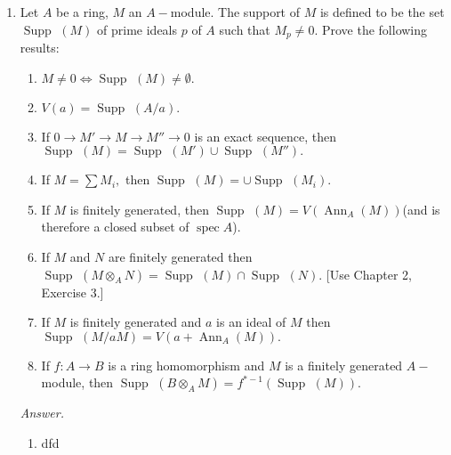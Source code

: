 \documentclass[answers, 12pt]{exam}
\DeclareMathOperator{\spec}{\text{spec}}
\DeclareMathOperator{\ann}{\text{Ann}}
\DeclareMathOperator{\supp}{\text{Supp~}}
\begin{document}
\begin{enumerate}

\item Let $A$ be a ring, $M$ an $A-$module. The support of $M$ is defined to be the set  $\supp(M)$ of prime ideals $p$ of $A$ such that $M_p\neq 0.$ Prove the following results:

		\begin{enumerate}
	
			\item $M\neq 0\Leftrightarrow \supp(M)\neq \emptyset.$
		
			\item $V(a)=\supp (A/a).$
		
			\item If $0\to M'\to M\to M''\to 0$ is an exact sequence, then $\supp(M)=\supp(M')\cup \supp(M'').$
		
			\item If $M=\sum M_i,$ then $\supp(M)=\cup\supp(M_i).$
		
			\item If $M$ is finitely generated, then $\supp(M)=V(\ann_A(M))$(and is therefore a closed subset of $\spec A$).
		
			\item If $M$ and $N$ are finitely generated then $\supp (M\otimes_A N)=\supp(M)\cap \supp(N).$ [Use Chapter 2, Exercise 3.]
		
			\item If $M$ is finitely generated and $a$ is an ideal of $M$ then $\supp(M/aM)=V(a+\ann_A(M)).$
		
			\item If $f:A\to B$ is a ring homomorphism and $M$ is a finitely generated $A-$module, then $\supp(B\otimes_A M)=f^{*-1}(\supp(M)).$
	
		\end{enumerate}

	\textit{Answer.}	\begin{enumerate}
	
		\item dfd	
	
	
	
	
	\end{enumerate}






















\end{enumerate}
\end{document}
